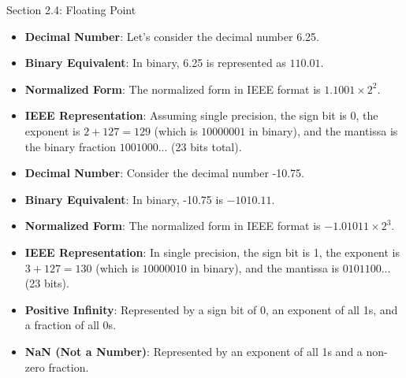 \begin{notes}{Section 2.4: Floating Point}
    \begin{highlight}
        \begin{itemize}
            \item \textbf{Decimal Number}: Let's consider the decimal number 6.25.
            \item \textbf{Binary Equivalent}: In binary, 6.25 is represented as $110.01$.
            \item \textbf{Normalized Form}: The normalized form in IEEE format is $1.1001 \times 2^2$.
            \item \textbf{IEEE Representation}: Assuming single precision, the sign bit is 0, the exponent is $2 + 127 = 129$ (which is $10000001$ in binary), and the mantissa is the binary fraction 
            $1001000...$ (23 bits total).
        \end{itemize}
    \end{highlight}

    \begin{highlight}
        \begin{itemize}
            \item \textbf{Decimal Number}: Consider the decimal number -10.75.
            \item \textbf{Binary Equivalent}: In binary, -10.75 is $-1010.11$.
            \item \textbf{Normalized Form}: The normalized form in IEEE format is $-1.01011 \times 2^3$.
            \item \textbf{IEEE Representation}: In single precision, the sign bit is 1, the exponent is $3 + 127 = 130$ (which is $10000010$ in binary), and the mantissa is $0101100...$ (23 bits).
        \end{itemize}
    \end{highlight}

    \begin{highlight}
        \begin{itemize}
            \item \textbf{Positive Infinity}: Represented by a sign bit of 0, an exponent of all 1s, and a fraction of all 0s.
            \item \textbf{NaN (Not a Number)}: Represented by an exponent of all 1s and a non-zero fraction.
        \end{itemize}
    \end{highlight}
    

\end{notes}
